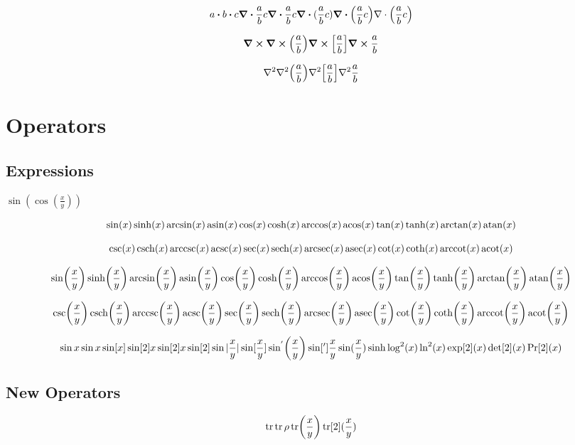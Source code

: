 \documentclass{article}
\begin{document}
\[
  a\dotproduct b \vdot c
  \divergence{\frac{a}{b}c}
  \div{\frac{a}{b}c}
  \div{(\frac{a}{b}c)}
  \div(\frac{a}{b}c)
  {\bf\nabla} \cdot \left(\frac{a}{b}c\right)
\]

\[
  \curl 
  \curl(\frac{a}{b})
  \curl[\frac{a}{b}]
  \curl{\frac{a}{b}}
\]

\[
  \laplacian 
  \laplacian(\frac{a}{b})
  \laplacian[\frac{a}{b}]
  \laplacian{\frac{a}{b}}
\]

\newpage

\section*{Operators}

\subsection*{Expressions}


$\sin(\cos(\frac{x}{y}))$

\[
  \sin(x)
  \sinh(x)
  \arcsin(x)
  \asin(x)
  \cos(x)
  \cosh(x)
  \arccos(x)
  \acos(x)
  \tan(x)
  \tanh(x)
  \arctan(x)
  \atan(x)
\]

\[
  \csc(x)
  \csch(x)
  \arccsc(x)
  \acsc(x)
  \sec(x)
  \sech(x)
  \arcsec(x)
  \asec(x)
  \cot(x)
  \coth(x)
  \arccot(x)
  \acot(x)
\]

\[
  \sin(\frac{x}{y})
  \sinh(\frac{x}{y})
  \arcsin(\frac{x}{y})
  \asin(\frac{x}{y})
  \cos(\frac{x}{y})
  \cosh(\frac{x}{y})
  \arccos(\frac{x}{y})
  \acos(\frac{x}{y})
  \tan(\frac{x}{y})
  \tanh(\frac{x}{y})
  \arctan(\frac{x}{y})
  \atan(\frac{x}{y})
\]

\[
  \csc(\frac{x}{y})
  \csch(\frac{x}{y})
  \arccsc(\frac{x}{y})
  \acsc(\frac{x}{y})
  \sec(\frac{x}{y})
  \sech(\frac{x}{y})
  \arcsec(\frac{x}{y})
  \asec(\frac{x}{y})
  \cot(\frac{x}{y})
  \coth(\frac{x}{y})
  \arccot(\frac{x}{y})
  \acot(\frac{x}{y})
\]


\[
  \sin x
  \sin{x}
  \sin[x]
  \sin[2]{x}
  \sin[2]x
  \sin[2]
  \sin|\frac{x}{y}|
  \sin[\frac{x}{y}]
  \sin['](\frac{x}{y})
  \sin[']{\frac{x}{y}}
  \sine(\frac{x}{y})
  \hypsine
  \log[2](x)
  \ln[2](x)
  \exp[2](x)
  \det[2](x)
  \Pr[2](x)
\]

\newpage
\subsection*{New Operators}

\[
  \tr
  \tr\rho
  \tr(\frac{x}{y})
  \tr[2](\frac{x}{y})
\]
\end{document}
